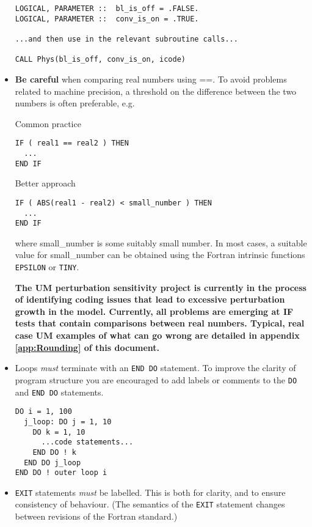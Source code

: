 \begin{itemize}
\begin{samepage}
\begin{verbatim}
LOGICAL, PARAMETER ::  bl_is_off = .FALSE.
LOGICAL, PARAMETER ::  conv_is_on = .TRUE.

...and then use in the relevant subroutine calls...

CALL Phys(bl_is_off, conv_is_on, icode)
\end{verbatim}
\end{samepage}

\item {\bf Be careful} when comparing real numbers using ==.
To avoid problems related to machine precision,
a threshold on the difference between the two numbers is often preferable,
e.g.

\begin{samepage}
Common practice
\begin{verbatim}
IF ( real1 == real2 ) THEN
  ...
END IF
\end{verbatim}
\end{samepage}
\pagebreak[0]
\begin{samepage}
Better approach
\begin{verbatim}
IF ( ABS(real1 - real2) < small_number ) THEN
  ...
END IF
\end{verbatim}
\end{samepage}
where small\_number is some suitably small number.
In most cases, a suitable value for small\_number can be obtained using the
Fortran intrinsic functions \verb|EPSILON| or \verb|TINY|.

{\bf The UM perturbation sensitivity project is currently in the process of
identifying coding issues that lead to excessive perturbation growth
in the model. Currently, all problems are emerging at
IF tests that contain comparisons between real numbers.
Typical, real case UM examples of what can go wrong are detailed in
appendix \ref{app:Rounding} of this document.}


\item Loops \emph{must} terminate with an \verb|END DO| statement.
      To improve the clarity of program structure you are encouraged to
      add labels or comments to the \verb|DO| and \verb|END DO| statements.

\begin{verbatim}
DO i = 1, 100
  j_loop: DO j = 1, 10
    DO k = 1, 10
      ...code statements...
    END DO ! k
  END DO j_loop
END DO ! outer loop i
\end{verbatim}

\item \verb|EXIT| statements \emph{must} be labelled. This is both for clarity,
      and to ensure consistency of behaviour. (The semantics of the \verb|EXIT|
      statement changes between revisions of the Fortran standard.)


\end{itemize}
